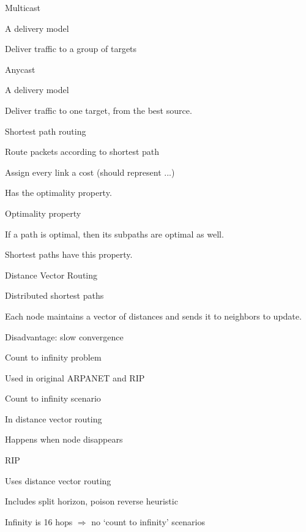 \documentclass[main.tex]{subfiles}
\begin{document}
\begin{card}{Multicast}
\item A delivery model
\item Deliver traffic to a group of targets
\end{card}

\begin{card}{Anycast}
\item A delivery model
\item Deliver traffic to one target, from the best source.
\end{card}

\begin{card}{Shortest path routing}
\item Route packets according to shortest path
\item Assign every link a cost (should represent ...)
\item Has the optimality property.
\end{card}

\begin{card}{Optimality property}
\item If a path is optimal, then its subpaths are optimal as well.
\item Shortest paths have this property.
\end{card}

\begin{card}{Distance Vector Routing}
\item Distributed shortest paths
\item Each node maintains a vector of distances and sends it to neighbors to update.
\item Disadvantage: slow convergence
\item Count to infinity problem
\item Used in original ARPANET and RIP
\end{card}

\begin{card}{Count to infinity scenario}
\item In distance vector routing
\item Happens when node disappears
\end{card}

\begin{card}{RIP}
\item Uses distance vector routing
\item Includes split horizon, poison reverse heuristic
\item Infinity is 16 hops $\Rightarrow$ no `count to infinity' scenarios
\end{card}
\end{document}
